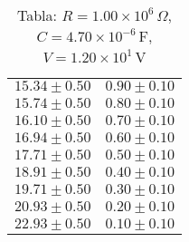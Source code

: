 \begin{table}[H]
\begin{tabular}{|c|c|}
$15.34 \pm 0.50$ & $0.90 \pm 0.10$ \\
$15.74 \pm 0.50$ & $0.80 \pm 0.10$ \\
$16.10 \pm 0.50$ & $0.70 \pm 0.10$ \\
$16.94 \pm 0.50$ & $0.60 \pm 0.10$ \\
$17.71 \pm 0.50$ & $0.50 \pm 0.10$ \\
$18.91 \pm 0.50$ & $0.40 \pm 0.10$ \\
$19.71 \pm 0.50$ & $0.30 \pm 0.10$ \\
$20.93 \pm 0.50$ & $0.20 \pm 0.10$ \\
$22.93 \pm 0.50$ & $0.10 \pm 0.10$ \\
\hline
\end{tabular}
\caption*{Tabla: $R = 1.00 \times 10^{6}\,\Omega$, $C = 4.70 \times 10^{-6}$\,F, $V = 1.20 \times 10^{1}$\,V}
\end{table}

